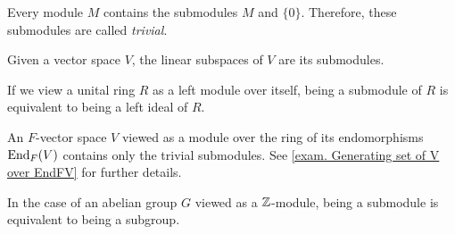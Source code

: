 \begin{exam}\begin{exlist}
\item Every module $M$ contains the submodules $M$ and $\lbrace 0\rbrace$. Therefore, these submodules are called \emph{trivial}.
\item Given a vector space $V$, the linear subspaces of $V$ are its submodules.
\item If we view a unital ring $R$ as a left module over itself, being a submodule of $R$ is equivalent to being a left ideal of $R$.
\item An $F$-vector space $V$ viewed as a module over the ring of its endomorphisms $\operatorname{\mathrm{End}}_F(V)$ contains only the trivial submodules. See \cref{exam. Generating set of V over EndFV} for further details.
\item In the case of an abelian group $G$ viewed as a $\operatorname{\mathbb{Z}}$-module, being a submodule is equivalent to being a subgroup.
\end{exlist}\end{exam}

